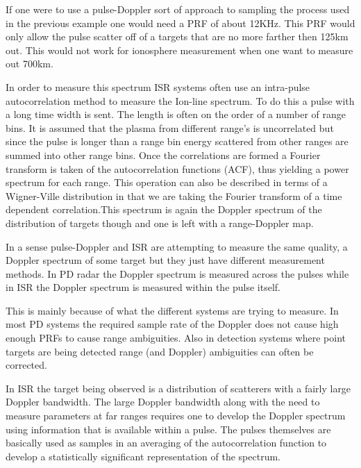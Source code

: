 If one were to use a pulse-Doppler sort of approach to sampling the process used in the previous example one would need a PRF of about 12KHz.  This PRF would only allow the pulse scatter off of a targets that are no more farther then 125km out.  This would not work for ionosphere measurement when one want to measure out 700km. 

In order to measure this spectrum ISR systems often use an intra-pulse autocorrelation method to measure the Ion-line spectrum.  To do this a pulse with a long time width is sent.  The length is often on the order of a number of range bins.  It is assumed that the plasma from different range's is uncorrelated but since the pulse is longer than a range bin energy scattered from other ranges are summed into other range bins.  Once the correlations are formed a Fourier transform is taken of the autocorrelation functions (ACF), thus yielding a power spectrum for each range.  This operation can also be described in terms of a Wigner-Ville distribution in that we are taking the Fourier transform of a time dependent correlation.\footnotemark[2] This spectrum is again the Doppler spectrum of the distribution of targets though and one is left with a range-Doppler map.

In a sense pulse-Doppler and ISR are attempting to measure the same quality, a Doppler spectrum of some target but they just have different measurement methods.  In PD radar the Doppler spectrum is measured across the pulses while in ISR the Doppler spectrum is measured within the pulse itself.  

This is mainly because of what the different systems are trying to measure.  In most PD systems the required sample rate of the Doppler does not cause high enough PRFs to cause range ambiguities.  Also in detection systems where point targets are being detected range (and Doppler) ambiguities can often be corrected.

In ISR the target being observed is a distribution of scatterers with a fairly large Doppler bandwidth.  The large Doppler bandwidth along with the need to measure parameters at far ranges requires one to develop the Doppler spectrum using information that is available within a pulse.  The pulses themselves are basically used as samples in an averaging of the autocorrelation function to develop a statistically significant representation of the spectrum.

